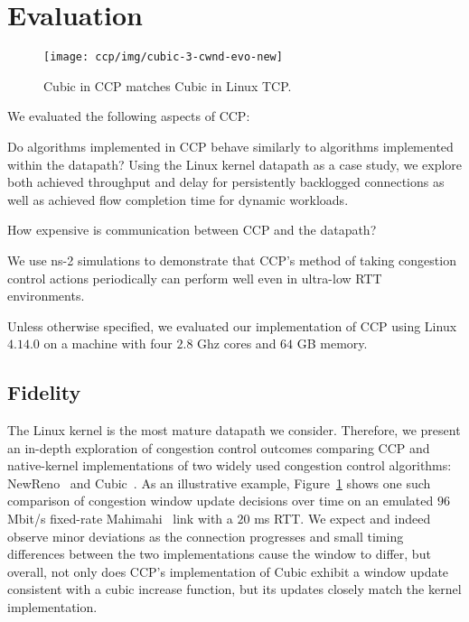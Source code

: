 \section{Evaluation}
\label{sec:eval}
\begin{figure}[t]
\centering
    \texttt{[image: ccp/img/cubic-3-cwnd-evo-new]}
    \caption{Cubic in CCP matches Cubic in Linux TCP.}\label{fig:eval:fidelity:time}
\end{figure}

\noindent
We evaluated the following aspects of CCP:

 Do algorithms implemented in CCP behave similarly to algorithms implemented within the datapath? Using the Linux kernel datapath as a case study, we explore both achieved throughput and delay for persistently backlogged connections as well as achieved flow completion time for dynamic workloads.

 How expensive is communication between CCP and the datapath?

 We use ns-2 simulations to demonstrate that CCP's method of taking congestion control actions periodically can perform well even in ultra-low RTT environments.

\smallskip
Unless otherwise specified, we evaluated our implementation of CCP using Linux $4.14.0$ on a machine with four $2.8$ Ghz cores and $64$ GB memory. 

\subsection{Fidelity}
\label{sec:eval:fidelity}

The Linux kernel is the most mature datapath we consider. Therefore, we present an in-depth exploration of congestion control outcomes comparing CCP and native-kernel implementations of two widely used congestion control algorithms: NewReno~\cite{newreno} and Cubic~\cite{cubic}.
As an illustrative example, Figure~\ref{fig:eval:fidelity:time} shows one such comparison of congestion window update decisions over time on an emulated $96$ Mbit/s fixed-rate Mahimahi~\cite{mahimahi} link with a $20$ ms RTT.
We expect and indeed observe minor deviations as the connection progresses and small timing differences between the two implementations cause the window to differ, but overall,
not only does CCP's implementation of Cubic exhibit a window update consistent with a cubic increase function, but its updates closely match the kernel implementation.

